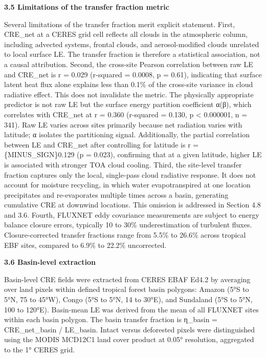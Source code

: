 \textbf{3.5 Limitations of the transfer fraction metric}

Several limitations of the transfer fraction merit explicit statement.
First, CRE\_net at a CERES grid cell reflects all clouds in the
atmospheric column, including advected systems, frontal clouds, and
aerosol-modified clouds unrelated to local surface LE. The transfer
fraction is therefore a statistical association, not a causal
attribution. Second, the cross-site Pearson correlation between raw LE
and CRE\_net is r = 0.029 (r-squared = 0.0008, p = 0.61), indicating
that surface latent heat flux alone explains less than 0.1\% of the
cross-site variance in cloud radiative effect. This does not invalidate
the metric. The physically appropriate predictor is not raw LE but the
surface energy partition coefficient α(β), which correlates with
CRE\_net at r = 0.360 (r-squared = 0.130, p \textless{} 0.000001, n =
341). Raw LE varies across sites primarily because net radiation varies
with latitude; α isolates the partitioning signal. Additionally, the
partial correlation between LE and CRE\_net after controlling for
latitude is r = \{MINUS\_SIGN\}0.129 (p = 0.023), confirming that at a
given latitude, higher LE is associated with stronger TOA cloud cooling.
Third, the site-level transfer fraction captures only the local,
single-pass cloud radiative response. It does not account for moisture
recycling, in which water evapotranspired at one location precipitates
and re-evaporates multiple times across a basin, generating cumulative
CRE at downwind locations. This omission is addressed in Section 4.8
and 3.6. Fourth, FLUXNET eddy covariance measurements are subject to
energy balance closure errors, typically 10 to 30\% underestimation of
turbulent fluxes. Closure-corrected transfer fractions range from 5.5\%
to 26.6\% across tropical EBF sites, compared to 6.9\% to 22.2\%
uncorrected.

\textbf{3.6 Basin-level extraction}

Basin-level CRE fields were extracted from CERES EBAF Ed4.2 by averaging
over land pixels within defined tropical forest basin polygons: Amazon
(5°S to 5°N, 75 to 45°W), Congo (5°S to 5°N, 14 to 30°E), and Sundaland
(5°S to 5°N, 100 to 120°E). Basin-mean LE was derived from the mean of
all FLUXNET sites within each basin polygon. The basin transfer fraction
is η\_basin = \textbar CRE\_net\_basin\textbar{} / LE\_basin. Intact
versus deforested pixels were distinguished using the MODIS MCD12C1 land
cover product at 0.05° resolution, aggregated to the 1° CERES grid.

